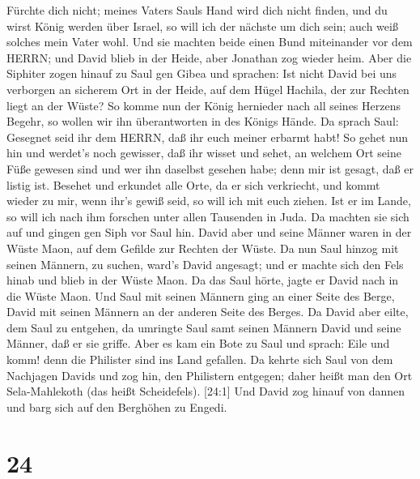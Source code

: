 Fürchte dich nicht; meines Vaters Sauls Hand wird dich nicht finden, und
du wirst König werden über Israel, so will ich der nächste um dich sein;
auch weiß solches mein Vater wohl.  Und sie machten beide
einen Bund miteinander vor dem HERRN; und David blieb in der Heide, aber
Jonathan zog wieder heim.  Aber die Siphiter zogen hinauf
zu Saul gen Gibea und sprachen: Ist nicht David bei uns verborgen an
sicherem Ort in der Heide, auf dem Hügel Hachila, der zur Rechten liegt
an der Wüste?  So komme nun der König hernieder nach all
seines Herzens Begehr, so wollen wir ihn überantworten in des Königs
Hände.  Da sprach Saul: Gesegnet seid ihr dem HERRN, daß
ihr euch meiner erbarmt habt!  So gehet nun hin und
werdet's noch gewisser, daß ihr wisset und sehet, an welchem Ort seine
Füße gewesen sind und wer ihn daselbst gesehen habe; denn mir ist
gesagt, daß er listig ist.  Besehet und erkundet alle Orte,
da er sich verkriecht, und kommt wieder zu mir, wenn ihr's gewiß seid,
so will ich mit euch ziehen. Ist er im Lande, so will ich nach ihm
forschen unter allen Tausenden in Juda.  Da machten sie
sich auf und gingen gen Siph vor Saul hin. David aber und seine Männer
waren in der Wüste Maon, auf dem Gefilde zur Rechten der Wüste.
 Da nun Saul hinzog mit seinen Männern, zu suchen, ward's
David angesagt; und er machte sich den Fels hinab und blieb in der Wüste
Maon. Da das Saul hörte, jagte er David nach in die Wüste Maon.
 Und Saul mit seinen Männern ging an einer Seite des Berge,
David mit seinen Männern an der anderen Seite des Berges. Da David aber
eilte, dem Saul zu entgehen, da umringte Saul samt seinen Männern David
und seine Männer, daß er sie griffe.  Aber es kam ein Bote
zu Saul und sprach: Eile und komm! denn die Philister sind ins Land
gefallen.  Da kehrte sich Saul von dem Nachjagen Davids und
zog hin, den Philistern entgegen; daher heißt man den Ort Sela-Mahlekoth
(das heißt Scheidefels).  {[}24:1{]} Und David zog hinauf
von dannen und barg sich auf den Berghöhen zu Engedi.

\hypertarget{section-23}{%
\section{24}\label{section-23}}

